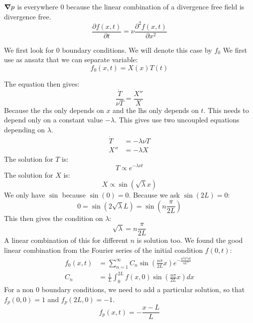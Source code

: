 ${\boldsymbol {\nabla}}p$ is everywhere 0 because the linear combination of a divergence free field is divergence free.
\begin{equation}
\frac{\partial f(x,t)}{\partial t}=\nu\frac{\partial^2 f(x,t)}{\partial x^2}
\end{equation}

We first look for 0 boundary conditions. We will denote this case by $f_0$
We first use as ansatz that we can separate variable:
\begin{equation}
 f_0(x,t)=X(x)T(t)
\end{equation}

The equation then gives:
\begin{equation}
	\frac{\dot{T}}{\nu T}=\frac{X''}{X}
\end{equation}
Because the rhs only depends on $x$ and the lhs only depends on $t$. This needs to depend only on a constant value $-\lambda$.
This gives use two uncoupled equations depending on $\lambda$.
\begin{align}
\dot{T}&=-\lambda \nu T\\
X''&=-\lambda X
\end{align}
The solution for $T$ is:
\begin{equation}
  T\propto e^{-\lambda \nu t}
\end{equation}
The solution for $X$ is:
\begin{equation}
	X\propto \sin(\sqrt{\lambda} x)
\end{equation}
We only have $\sin$ because $\sin(0)=0$.
Because we ask $\sin(2L)=0$:
\begin{equation}
	0=\sin(2\sqrt{\lambda} L)=\sin\left(n\frac{\pi}{2L}\right)
\end{equation}
This then gives the condition on $\lambda$:
\begin{equation}
	\sqrt{\lambda}=n\frac{\pi}{2L}
\end{equation}
A linear combination of this for different $n$ is solution too.
We found the good linear combination from the Fourier series of the initial condition $f(0,t)$:
\begin{align}
  f_0(x,t)&=\sum_{n=1}^{\infty}C_{n}\sin\left(\frac{n\pi}{2L}x\right)e^{-\frac{n^2\pi^2\nu t}{4L^2}}\\
  C_{n}&=\frac{1}{L}\int_{0}^{2L}f(x,0)\sin\left(\frac{n\pi}{2L}x\right) dx
\end{align}
For a non 0 boundary conditions, we need to add a particular solution, so that $f_p(0,0)=1$ and $f_p(2L,0)=-1$.
\begin{equation}
	f_{p}(x,t)=-\frac{x-L}{L}
\end{equation}
